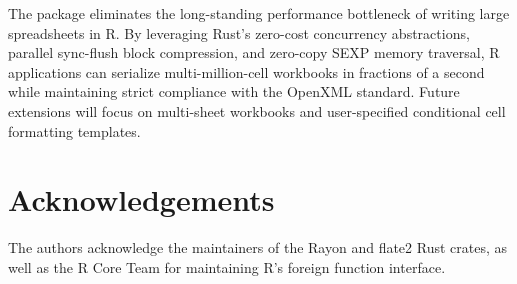 The  package eliminates the long-standing performance bottleneck of writing large spreadsheets in R. By leveraging Rust's zero-cost concurrency abstractions, parallel sync-flush block compression, and zero-copy SEXP memory traversal, R applications can serialize multi-million-cell workbooks in fractions of a second while maintaining strict compliance with the OpenXML standard. Future extensions will focus on multi-sheet workbooks and user-specified conditional cell formatting templates.

\section{Acknowledgements}\label{acknowledgements}

The authors acknowledge the maintainers of the Rayon and flate2 Rust crates, as well as the R Core Team for maintaining R's foreign function interface.



\address{%
Amin Fathullah\\
Open Source Contributor\\%
Surabaya, Indonesia\\
%
%
%
\href{mailto:amin_fathullah@yahoo.com}{\nolinkurl{amin\_fathullah@yahoo.com}}%
}
